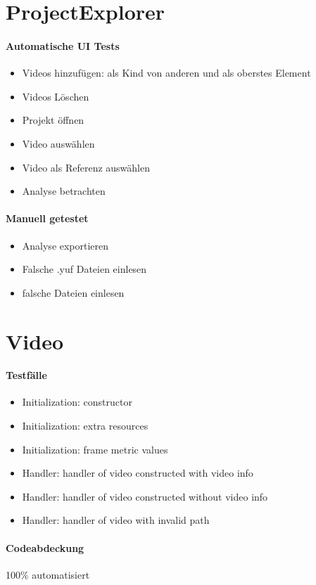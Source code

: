 \section{ProjectExplorer}
\paragraph{Automatische UI Tests}
\begin{itemize}
\item Videos hinzufügen: als Kind von anderen und als oberstes Element
\item Videos Löschen
\item Projekt öffnen
\item Video auswählen
\item Video als Referenz auswählen
\item Analyse betrachten 
\end{itemize}
\paragraph{Manuell getestet}
\begin{itemize}
\item Analyse exportieren
\item Falsche .yuf Dateien einlesen
\item falsche Dateien einlesen
\end{itemize}

\section{Video}
\paragraph*{Testfälle}
\begin{itemize}
\item Initialization: constructor
\item Initialization: extra resources
\item Initialization: frame metric values
\item Handler: handler of video constructed with video info
\item Handler: handler of video constructed without video info
\item Handler: handler of video with invalid path
\end{itemize}

\paragraph*{Codeabdeckung}
100\% automatisiert

